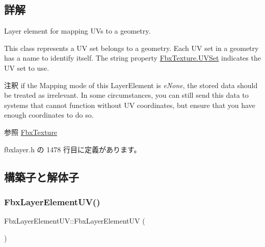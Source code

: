 \subsection{詳解}
Layer element for mapping U\+Vs to a geometry. 

This class represents a UV set belongs to a geometry. Each UV set in a geometry has a name to identify itself. The string property \hyperlink{class_fbx_texture_ae28f2e1c33fa74ab1e9752f9de0be552}{Fbx\+Texture.\+U\+V\+Set} indicates the UV set to use.

\begin{DoxyRemark}{注釈}
if the Mapping mode of this Layer\+Element is {\itshape e\+None}, the stored data should be treated as irrelevant. In some circumstances, you can still send this data to systems that cannot function without UV coordinates, but ensure that you have enough coordinates to do so.
\end{DoxyRemark}
\begin{DoxySeeAlso}{参照}
\hyperlink{class_fbx_texture}{Fbx\+Texture} 
\end{DoxySeeAlso}


 fbxlayer.\+h の 1478 行目に定義があります。



\subsection{構築子と解体子}
\mbox{\label{class_fbx_layer_element_u_v_aaae1d6237b2f507a37344bc53f7667b0}} 
\subsubsection{\texorpdfstring{Fbx\+Layer\+Element\+U\+V()}{FbxLayerElementUV()}}
{\footnotesize\ttfamily Fbx\+Layer\+Element\+U\+V\+::\+Fbx\+Layer\+Element\+UV (\begin{DoxyParamCaption}{ }\end{DoxyParamCaption})\hspace{0.3cm}{\ttfamily [protected]}}

\mbox{\label{class_fbx_layer_element_u_v_a2906e0439687d1a8aa41b1f68c0990d7}} 
